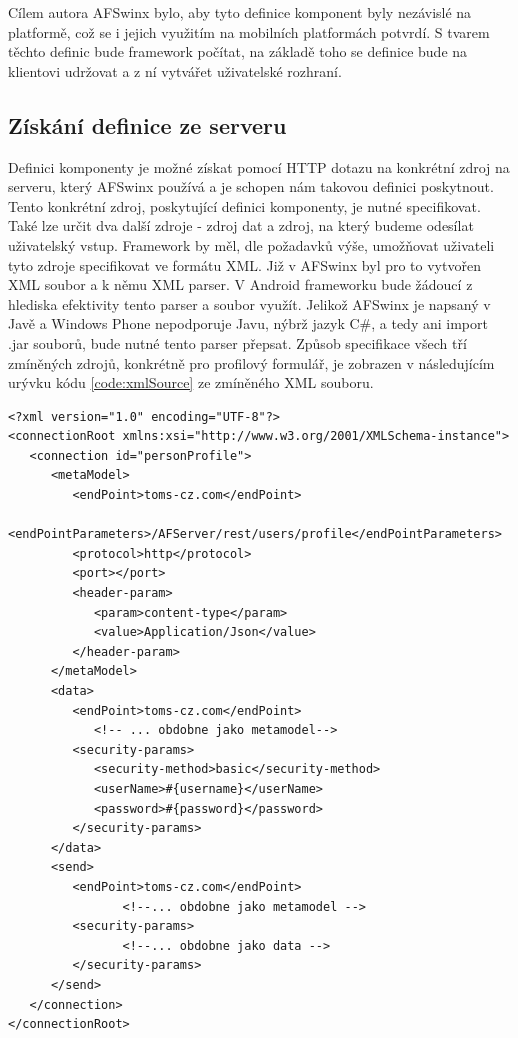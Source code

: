 Cílem autora AFSwinx bylo, aby tyto definice komponent byly nezávislé na platformě, což se i jejich využitím na mobilních platformách potvrdí. S tvarem těchto definic bude framework počítat, na základě toho se definice bude na klientovi udržovat a z ní vytvářet uživatelské rozhraní. 

\subsection{Získání definice ze serveru}
Definici komponenty je možné získat pomocí HTTP dotazu na konkrétní zdroj na serveru, který AFSwinx používá a je schopen nám takovou definici poskytnout. Tento konkrétní zdroj, poskytující definici komponenty, je nutné specifikovat. Také lze určit dva další zdroje - zdroj dat a zdroj, na který budeme odesílat uživatelský vstup. Framework by měl, dle požadavků výše, umožňovat uživateli tyto zdroje specifikovat ve formátu XML. Již v AFSwinx byl pro to vytvořen XML soubor a k němu XML parser. V Android frameworku bude žádoucí z hlediska efektivity tento parser a soubor využít. Jelikož AFSwinx je napsaný v Javě a Windows Phone nepodporuje Javu, nýbrž jazyk C\#, a tedy ani import .jar souborů, bude nutné tento parser přepsat. Způsob specifikace všech tří zmíněných zdrojů, konkrétně pro profilový formulář, je zobrazen v následujícím urývku kódu \ref{code:xmlSource} ze zmíněného XML souboru.

\begin{lstlisting}[caption=Ukázka XML specifikace zdrojů,
label={code:xmlSource}, basicstyle=\footnotesize]
<?xml version="1.0" encoding="UTF-8"?>
<connectionRoot xmlns:xsi="http://www.w3.org/2001/XMLSchema-instance">
   <connection id="personProfile">
      <metaModel>
         <endPoint>toms-cz.com</endPoint>
         <endPointParameters>/AFServer/rest/users/profile</endPointParameters>
         <protocol>http</protocol>
         <port></port>
         <header-param>
            <param>content-type</param>
            <value>Application/Json</value>
         </header-param>
      </metaModel>
      <data>
         <endPoint>toms-cz.com</endPoint>
         	<!-- ... obdobne jako metamodel-->
         <security-params>
            <security-method>basic</security-method>
            <userName>#{username}</userName>
            <password>#{password}</password>
         </security-params>
      </data>
      <send>
         <endPoint>toms-cz.com</endPoint>
            	<!--... obdobne jako metamodel -->
         <security-params>
                <!--... obdobne jako data -->
         </security-params>
      </send>
   </connection>
</connectionRoot>
\end{lstlisting}

